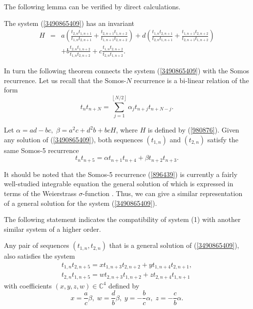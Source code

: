 \documentclass[12pt]{llncs}
\begin{document}
The following lemma can be verified by direct calculations.
\begin{lemma}
The system (\ref{3490865409}) has an invariant
\begin{eqnarray}
H&=&a\left(\frac{t_{2, n}t_{1, n+1}}{t_{1, n}t_{2, n+1}}+\frac{t_{2, n+1}t_{1, n+2}}{t_{1, n+1}t_{2, n+2}}\right)+ d \left(\frac{t_{1, n}t_{2, n+1}}{t_{2, n}t_{1, n+1}} +\frac{t_{1, n+1}t_{2, n+2}}{t_{2, n+1}t_{1, n+2}}\right) \nonumber \\
&&+ b \frac{t_{2, n}t_{1, n+2}}{t_{1, n}t_{2, n+2}}+c \frac{t_{1, n}t_{2, n+2}}{t_{2, n}t_{1, n+2}}.
\label{980876}
\end{eqnarray}
\end{lemma}
In turn the following theorem connects the  system (\ref{3490865409}) with the Somos recurrence. Let us recall that the Somos-$N$ recurrence is a bi-linear relation of the form
\[
t_nt_{n+N}=\sum_{j=1}^{\left\lfloor N/2 \right\rfloor}\alpha_j t_{n+j}t_{n+N-j}.
\]
\begin{theorem}
Let $\alpha=ad-bc,\; \beta=a^2 c + d^2 b +b c H$, where $H$ is defined by (\ref{980876}). Given any solution of (\ref{3490865409}), both sequences $(t_{1, n})$ and $(t_{2, n})$ satisfy the same Somos-5 recurrence
\begin{equation}
t_{n} t_{n+5}=\alpha t_{n+1} t_{n+4} + \beta t_{n+2} t_{n+3}.
\label{896439}
\end{equation}
\end{theorem}
It should be noted that the Somos-5 recurrence (\ref{896439}) is currently a fairly well-studied integrable equation  the general solution of which is expressed in terms of the Weierstrass $\sigma$-function \cite{Hone2007}. Thus, we can give a similar representation of a general solution for the system (\ref{3490865409}).

The following statement indicates the compatibility of system (1) with another similar system of a higher order.
\begin{proposition}
Any pair of sequences $(t_{1, n}, t_{2, n})$ that is a general solution of (\ref{3490865409}),  also satisfies the system
\begin{equation}
\begin{array}{l}
t_{1, n} t_{2, n+5}=x t_{1, n+3} t_{2, n+2} + y t_{1, n+4} t_{2, n+1}, \\[0.3cm]
t_{2, n} t_{1, n+5}=w t_{2, n+3} t_{1, n+2} + z t_{2, n+4} t_{1, n+1} 
\end{array}
\label{34988888}
\end{equation}
with coefficients $(x, y, z, w)\in \mathbb{C}^4$ defined by
\[
x=\frac{a}{c} \beta,\; w=\frac{d}{b} \beta,\;y=-\frac{b }{c}\alpha,\; z=-\frac{c }{b}\alpha.
\]
\end{proposition}
\end{document}
